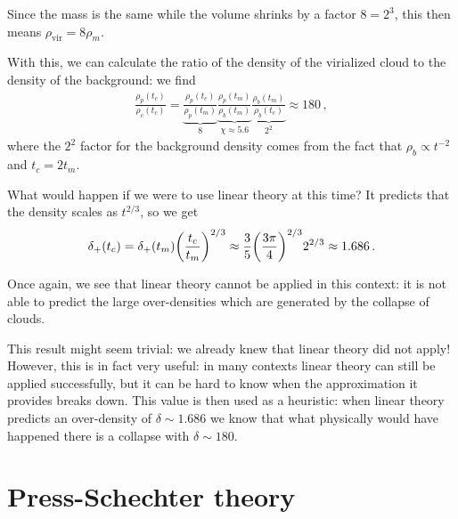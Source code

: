 \documentclass[main.tex]{subfiles}
\begin{document}
Since the mass is the same while the volume shrinks by a factor \(8 = 2^{3}\), this then means \(\rho _{\text{vir}} = 8 \rho_{m}\). 

With this, we can calculate the ratio of the density of the virialized cloud to the density of the background: we find
%
\begin{align}
\frac{\rho_{p}(t_c)}{\rho_{c}(t_c)} = \underbrace{\frac{\rho_{p}(t_c)}{\rho_{p}(t_m)}}_{8} \underbrace{\frac{\rho_{p}(t_m)}{\rho_{b}(t_m)}}_{\chi \approx 5.6} \underbrace{\frac{\rho_{b}(t_m)}{\rho_{b} (t_c)}}_{2^2}
\approx 180
\,,
\end{align}
%
where the \(2^{2}\) factor for the background density comes from the fact that \(\rho_b \propto t^{-2}\) and \(t_c = 2 t_m\).


What would happen if we were to use linear theory at this time?
It predicts that the density scales as \(t^{2/3}\), so we get
%
\begin{align}
\delta_{+} (t_c) = \delta_{+}(t_m) \qty(\frac{t_c}{t_m})^{2/3}
\approx \frac{3}{5} \qty(\frac{3 \pi }{4})^{2/3} 2^{2/3} \approx 1.686
\,.
\end{align}

Once again, we see that linear theory cannot be applied in this context: it is not able to predict the large over-densities which are generated by the collapse of clouds.

This result might seem trivial: we already knew that linear theory did not apply! 
However, this is in fact very useful: in many contexts linear theory can still be applied successfully, but it can be hard to know when the approximation it provides breaks down. This value is then used as a heuristic: when linear theory predicts an over-density of \(\delta  \sim 1.686\) we know that what physically would have happened there is a collapse with \(\delta \sim 180\).


\section{Press-Schechter theory}
\end{document}
